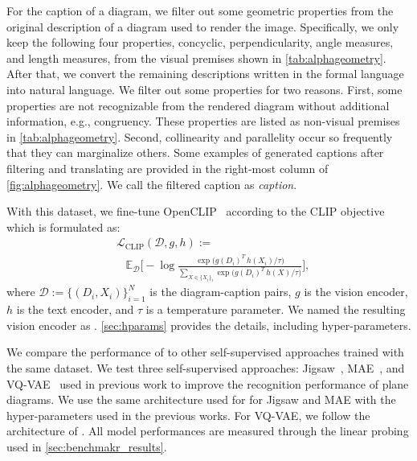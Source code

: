 For the caption of a diagram, we filter out some geometric properties from the original description of a diagram used to render the image. Specifically, we only keep the following four properties, concyclic, perpendicularity, angle measures, and length measures, from the visual premises shown in \cref{tab:alphageometry}. After that, we convert the remaining descriptions written in the formal language into natural language. We filter out some properties for two reasons.
First, some properties are not recognizable from the rendered diagram without additional information, e.g., congruency. These properties are listed as non-visual premises in \cref{tab:alphageometry}. Second, collinearity and parallelity occur so frequently that they can marginalize others.
Some examples of generated captions after filtering and translating are provided in the right-most column of \cref{fig:alphageometry}. We call the filtered caption as \emph{\captionstyle{} caption}.

With this dataset, we fine-tune OpenCLIP~\citep{clip} according to the CLIP objective which is formulated as:
\begin{align}
    &\mathcal{L}_{\textrm{CLIP}}(\mathcal{D}, g, h) := \nonumber \\
    &\,\,\,\,\,\mathbb{E}_{\mathcal{D}} \!\biggl[ -\log \frac{\exp \bigl( g(D_i)^T \, h(X_i) / \tau \bigr)}{\sum_{X \in \{X_i\}_i} \exp \bigl( g(D_i)^T \, h(X) / \tau \bigr)} \biggr],
    \label{eq:clip}
\end{align}
where \(\mathcal{D} := \{(D_i, X_i)\}_{i=1}^N\) is the diagram-caption pairs, $g$ is the vision encoder, $h$ is the text encoder, and \(\tau\) is a temperature parameter.
We named the resulting vision encoder as \geoclip{}. \cref{sec:hparams} provides the details, including hyper-parameters.

We compare the performance of \geoclip{} to other self-supervised approaches trained with the same dataset. We test three self-supervised approaches: Jigsaw~\citep{geoqa, geoqa-plus}, MAE~\citep{scagps, geox}, and VQ-VAE~\citep{unimath} used in previous work to improve the recognition performance of plane diagrams. We use the same architecture used for \geoclip{} for Jigsaw and MAE with the hyper-parameters used in the previous works. For VQ-VAE, we follow the architecture of \citet{unimath}. 
All model performances are measured through the linear probing used in \cref{sec:benchmakr_results}. 

